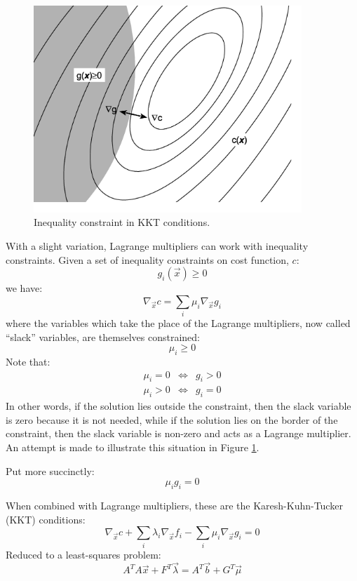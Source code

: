 \documentclass{article}
\newcommand{\mat}{A}
\newcommand{\sol}{b}
\newcommand{\eqmat}{F}
\newcommand{\ineqmat}{G}
\newcommand{\cost}{c}
\newcommand{\eqfn}{f}
\newcommand{\ineqfn}{g}
\newcommand{\coord}{x}
\newcommand{\slack}{\mu}
\begin{document}
\begin{figure}
	\includegraphics[width=0.9\textwidth]{inequality.eps}
	\caption{Inequality constraint in KKT conditions.}\label{ineq_fig}
\end{figure}

With a slight variation, Lagrange multipliers can work with inequality
constraints.
Given a set of inequality constraints on cost function, $\cost$:
\begin{equation}
	\ineqfn_i(\vec \coord) \ge 0
 	\label{inequality2}
\end{equation}
we have:
\begin{equation}
	\nabla_{\vec \coord} \cost = \sum_i \slack_i \nabla_{\vec \coord} \ineqfn_i
\end{equation}
where the variables which take the place of the Lagrange multipliers,
now called ``slack'' variables, are themselves constrained:
\begin{equation}
	\slack_i \ge 0
\end{equation}
Note that:
\begin{eqnarray}
\slack_i = 0 & \iff & \ineqfn_i > 0 \\
	\slack_i > 0 & \iff & \ineqfn_i = 0
\end{eqnarray}
In other words, if the solution lies outside the constraint, then the slack
variable is zero because it is not needed, 
while if the solution lies on the border of the constraint,
then the slack variable is non-zero and acts as a Lagrange multiplier.
An attempt is made to illustrate this situation in Figure \ref{ineq_fig}.

Put more succinctly:
\begin{equation}
	\slack_i \ineqfn_i = 0
\end{equation}

When combined with Lagrange multipliers, these are the Karesh-Kuhn-Tucker (KKT)
conditions:
\begin{equation}
	\nabla_{\vec \coord} \cost + \sum_i \lambda_i \nabla_{\vec \coord} \eqfn_i - \sum_i \slack_i \nabla_{\vec \coord} \ineqfn_i = 0
\end{equation}
Reduced to a least-squares problem:
\begin{equation}
	\mat^T \mat \vec \coord + \eqmat^T \vec \lambda = \mat^T \vec \sol + \ineqmat^T \vec \slack
\end{equation}
	


\end{document}
